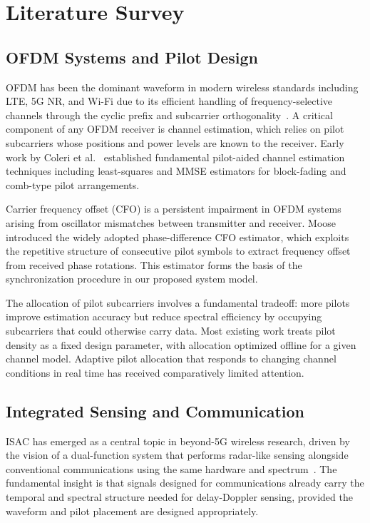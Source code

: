 \chapter{Literature Survey}

\section{OFDM Systems and Pilot Design}

OFDM has been the dominant waveform in modern wireless standards including LTE, 5G NR, and Wi-Fi due to its efficient handling of frequency-selective channels through the cyclic prefix and subcarrier orthogonality~\cite{proakis2008digital}. A critical component of any OFDM receiver is channel estimation, which relies on pilot subcarriers whose positions and power levels are known to the receiver. Early work by Coleri et al.~\cite{coleri2002channel} established fundamental pilot-aided channel estimation techniques including least-squares and MMSE estimators for block-fading and comb-type pilot arrangements.

Carrier frequency offset (CFO) is a persistent impairment in OFDM systems arising from oscillator mismatches between transmitter and receiver. Moose~\cite{moose1994technique} introduced the widely adopted phase-difference CFO estimator, which exploits the repetitive structure of consecutive pilot symbols to extract frequency offset from received phase rotations. This estimator forms the basis of the synchronization procedure in our proposed system model.

The allocation of pilot subcarriers involves a fundamental tradeoff: more pilots improve estimation accuracy but reduce spectral efficiency by occupying subcarriers that could otherwise carry data. Most existing work treats pilot density as a fixed design parameter, with allocation optimized offline for a given channel model. Adaptive pilot allocation that responds to changing channel conditions in real time has received comparatively limited attention.

\section{Integrated Sensing and Communication}

ISAC has emerged as a central topic in beyond-5G wireless research, driven by the vision of a dual-function system that performs radar-like sensing alongside conventional communications using the same hardware and spectrum~\cite{sturm2011waveform}. The fundamental insight is that signals designed for communications already carry the temporal and spectral structure needed for delay-Doppler sensing, provided the waveform and pilot placement are designed appropriately.

